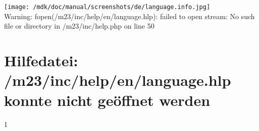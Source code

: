 \section{}
\texttt{[image: /mdk/doc/manual/screenshots/de/language.info.jpg]} \\
 Warning: fopen(/m23/inc/help/en/language.hlp): failed to open stream: No such file or directory in /m23/inc/help.php on line 50 \section{Hilfedatei: /m23/inc/help/en/language.hlp konnte nicht ge\"offnet werden}
1 

